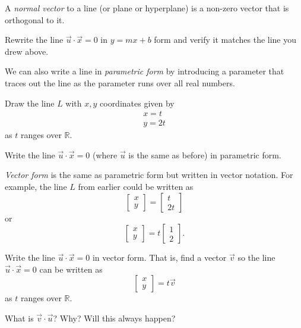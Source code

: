 \documentclass{problemset}
\newcommand{\R}{\mathbb{R}}
\begin{document}
	\begin{definition}
		A \emph{normal vector} to a line (or plane or hyperplane) is a non-zero vector that is orthogonal to it.
	\end{definition}

	\begin{parts}[resume]
		\item Rewrite the line $\vec u\cdot \vec x = 0$ in $y=mx+b$ form and verify it matches
		the line you drew above.
	\end{parts}

	\question
	We can also write a line in \emph{parametric form} by introducing a parameter
	that traces out the line as the parameter runs over all real numbers.
	\begin{parts}
		\item Draw the line $L$ with $x,y$ coordinates given by
		\[
			\begin{array}{l}x=t\\y=2t\end{array}
		\]
		as $t$ ranges over $\R$.
		\item Write the line $\vec u \cdot \vec x=0$ (where $\vec u$ is the same as before) in parametric form.
	\end{parts}
	
	\question
	\emph{Vector form} is the same as parametric form but written in vector notation.  For example, the
	line $L$ from earlier could be written as 
	\[
		\begin{bmatrix}x\\y\end{bmatrix}=\begin{bmatrix}t\\2t\end{bmatrix}
	\]
	or
	\[
		\begin{bmatrix}x\\y\end{bmatrix}=t\begin{bmatrix}1\\2\end{bmatrix}.
	\]

	\begin{parts}
		\item Write the line $\vec u\cdot \vec x=0$ in vector form.  That is, find a vector $\vec v$ so
		the line $\vec u\cdot \vec x=0$  can be written as
		\[
			\begin{bmatrix}x\\y\end{bmatrix} = t\vec v
		\]
		as $t$ ranges over $\R$.
		\item What is $\vec v\cdot \vec u$? Why? Will this always happen?
	\end{parts}
\end{document}

